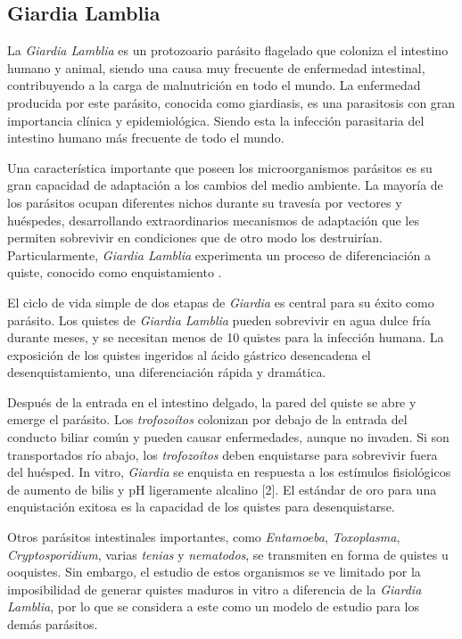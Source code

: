   \subsection{Giardia Lamblia}
    La \textit{Giardia Lamblia} es un protozoario parásito flagelado que coloniza el intestino humano
    y animal, siendo una causa muy frecuente de enfermedad intestinal, contribuyendo a la carga
    de malnutrición en todo el mundo. La enfermedad producida por este parásito, conocida
    como giardiasis, es una parasitosis con gran importancia clínica y epidemiológica. Siendo esta
    la infección parasitaria del intestino humano más frecuente de todo el mundo.

    Una característica importante que poseen los microorganismos parásitos es su gran capacidad de
    adaptación a los cambios del medio ambiente. La mayoría de los parásitos ocupan
    diferentes nichos durante su travesía por vectores y huéspedes, desarrollando extraordinarios
    mecanismos de adaptación que les permiten sobrevivir en condiciones que de otro modo
    los destruirían. Particularmente, \textit{Giardia Lamblia} experimenta un proceso de diferenciación
    a quiste, conocido como enquistamiento \cite{gda}.

    El ciclo de vida simple de dos etapas de \textit{Giardia} es central para su éxito como parásito. Los
    quistes de \textit{Giardia Lamblia} pueden sobrevivir en agua dulce fría durante meses, y se necesitan
    menos de 10 quistes para la infección humana. La exposición de los quistes ingeridos al ácido
    gástrico desencadena el desenquistamiento, una diferenciación rápida y dramática.

    Después de la entrada en el intestino delgado, la pared del quiste se abre y emerge el
    parásito. Los \textit{trofozoítos} colonizan por debajo de la entrada del conducto biliar común y pueden
    causar enfermedades, aunque no invaden. Si son transportados río abajo, los \textit{trofozoítos}
    deben enquistarse para sobrevivir fuera del huésped. In vitro, \textit{Giardia} se enquista en respuesta a
    los estímulos fisiológicos de aumento de bilis y pH ligeramente alcalino [2]. El estándar
    de oro para una enquistación exitosa es la capacidad de los quistes para desenquistarse.

    Otros parásitos intestinales importantes, como \textit{Entamoeba}, \textit{Toxoplasma}, \textit{Cryptosporidium}, varias
    \textit{tenias} y \textit{nematodos}, se transmiten en forma de quistes u ooquistes. Sin embargo,
    el estudio de estos organismos se ve limitado por la imposibilidad de generar quistes maduros
    in vitro a diferencia de la \textit{Giardia Lamblia}, por lo que se considera a este como un modelo
    de estudio para los demás parásitos.

